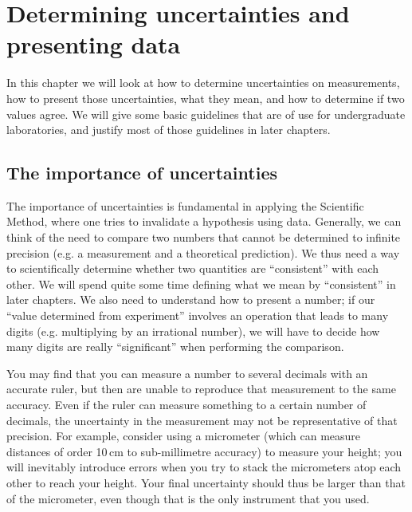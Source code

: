 \chapter{Determining uncertainties and presenting data}
In this chapter we will look at how to determine uncertainties on measurements, how to present those uncertainties, what they mean, and how to determine if two values agree. We will give some basic guidelines that are of use for undergraduate laboratories, and justify most of those guidelines in later chapters.

\section{The importance of uncertainties}
The importance of uncertainties is fundamental in applying the Scientific Method, where one tries to invalidate a hypothesis using data. Generally, we can think of the need to compare two numbers that cannot be determined to infinite precision (e.g. a measurement and a theoretical prediction). We thus need a way to scientifically determine whether two quantities are ``consistent'' with each other. We will spend quite some time defining what we mean by ``consistent'' in later chapters. We also need to understand how to present a number; if our ``value determined from experiment'' involves an operation that leads to many digits (e.g. multiplying by an irrational number), we will have to decide how many digits are really ``significant'' when performing the comparison.

You may find that you can measure a number to several decimals with an accurate ruler, but then are unable to reproduce that measurement to the same accuracy. Even if the ruler can measure something to a certain number of decimals, the uncertainty in the measurement may not be representative of that precision. For example, consider using a micrometer (which can measure distances of order 10\,cm to sub-millimetre accuracy) to measure your height; you will inevitably introduce errors when you try to stack the micrometers atop each other to reach your height. Your final uncertainty should thus be larger than that of the micrometer, even though that is the only instrument that you used.
 
